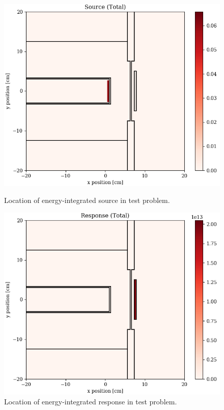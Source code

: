 \begin{figure}
  \centering
  \begin{minipage}{0.49\linewidth}
    \centering
    \includegraphics[width=\linewidth]{content/testprob/source_total.png}
    \caption{Location of energy-integrated source in test problem.}
    \label{fig:testprob:source_total}
  \end{minipage}
  \hfill
  \begin{minipage}{0.49\linewidth}
    \centering
    \includegraphics[width=\linewidth]{content/testprob/response_total.png}
    \caption{Location of energy-integrated response in test problem.}
    \label{fig:testprob:response_total}
  \end{minipage}
\end{figure}

